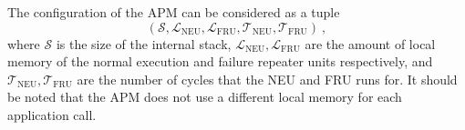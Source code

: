 The configuration of the APM can be considered as a tuple
\[
(\mathcal{S},\mathcal{L}_{\text{NEU}},\mathcal{L}_{\text{FRU}},\mathcal{T}_{\text{NEU}},
\mathcal{T}_{\text{FRU}})\ ,
\]
where $\mathcal{S}$ is the size of the internal stack, $\mathcal{L}_{\text{NEU}},\mathcal{L}_{\text{FRU}}$ are the
amount of local memory of the normal execution and failure repeater units respectively, and
$\mathcal{T}_{\text{NEU}},\mathcal{T}_{\text{FRU}}$ are the number of cycles that the NEU and FRU runs for. It should
be noted that the APM does not use a different local memory for each application call.

%
